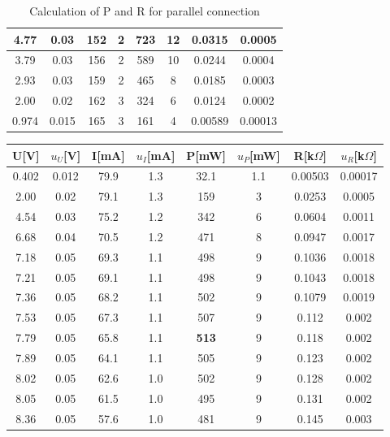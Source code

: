 \documentclass[12pt,a4paper]{article}
\begin{document}
\begin{table}[H]
\begin{tabular}{|c|c|c|c|c|c|c|c|}
    4.77    & 0.03 & 152       & 2   & 723 & 12 & 0.0315  & 0.0005  \\ \hline
    3.79    & 0.03 & 156       & 2   & 589 & 10 & 0.0244  & 0.0004  \\ \hline
    2.93    & 0.03 & 159       & 2   & 465 & 8  & 0.0185  & 0.0003  \\ \hline
    2.00    & 0.02 & 162       & 3   & 324 & 6  & 0.0124  & 0.0002  \\ \hline
    0.974    & 0.015 & 165       & 3   & 161 & 4  & 0.00589 & 0.00013 \\ \hline
    \end{tabular}
    \caption{ Calculation of P and R for parallel connection}
\end{table}

\begin{table}[H]
    \centering
    \begin{tabular}{|c|c|c|c|c|c|c|c|}
    \hline
    U{[}V{]} & $u_U$[V] & I{[}mA{]} & $u_I$[mA] & P[mW] & $u_P$[mW] & R[k$\Omega$] & $u_R$[k$\Omega$]\\ \hline
    0.402    & 0.012 & 79.9      & 1.3 & 32.1 & 1.1 & 0.00503 & 0.00017 \\ \hline
    2.00     & 0.02  & 79.1      & 1.3 & 159  & 3   & 0.0253 & 0.0005 \\ \hline
    4.54     & 0.03  & 75.2      & 1.2 & 342  & 6   & 0.0604 & 0.0011 \\ \hline
    6.68     & 0.04  & 70.5      & 1.2 & 471  & 8   & 0.0947 & 0.0017 \\ \hline
    7.18     & 0.05  & 69.3      & 1.1 & 498  & 9   & 0.1036 & 0.0018 \\ \hline
    7.21     & 0.05  & 69.1      & 1.1 & 498  & 9   & 0.1043 & 0.0018 \\ \hline
    7.36     & 0.05  & 68.2      & 1.1 & 502  & 9   & 0.1079 & 0.0019 \\ \hline
    7.53     & 0.05  & 67.3      & 1.1 & 507  & 9   & 0.112  & 0.002  \\ \hline
    7.79     & 0.05  & 65.8      & 1.1 & \textbf{513}  & 9   & 0.118  & 0.002  \\ \hline
    7.89     & 0.05  & 64.1      & 1.1 & 505  & 9   & 0.123  & 0.002  \\ \hline
    8.02     & 0.05  & 62.6      & 1.0 & 502  & 9   & 0.128  & 0.002  \\ \hline
    8.05     & 0.05  & 61.5      & 1.0 & 495  & 9   & 0.131  & 0.002  \\ \hline
    8.36     & 0.05  & 57.6      & 1.0 & 481  & 9   & 0.145  & 0.003  \\ \hline

\end{tabular}
\end{table}
\end{document}
